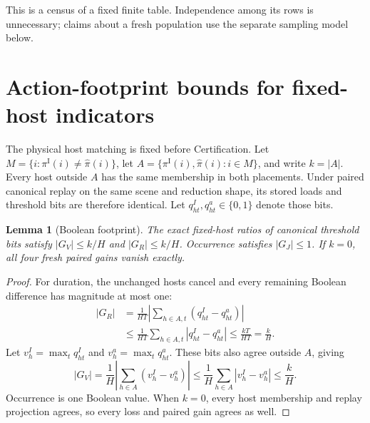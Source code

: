 \documentclass[11pt]{article}
\newtheorem{lemma}{Lemma}
\newcommand{\inc}{\pi^{\mathrm I}}
\newcommand{\act}{\widehat\pi}
\begin{document}
This is a census of a fixed finite table. Independence among its rows is unnecessary; claims about a fresh population use the separate sampling model below.

\section{Action-footprint bounds for fixed-host indicators}
The physical host matching is fixed before Certification. Let $M=\{i:\inc(i)\ne\act(i)\}$, let $A=\{\inc(i),\act(i):i\in M\}$, and write $k=|A|$. Every host outside $A$ has the same membership in both placements. Under paired canonical replay on the same scene and reduction shape, its stored loads and threshold bits are therefore identical. Let $q_{ht}^I,q_{ht}^a\in\{0,1\}$ denote those bits.

\begin{lemma}[Boolean footprint]
The exact fixed-host ratios of canonical threshold bits satisfy $|G_V|\le k/H$ and $|G_R|\le k/H$. Occurrence satisfies $|G_J|\le1$. If $k=0$, all four fresh paired gains vanish exactly.
\end{lemma}
\begin{proof}
For duration, the unchanged hosts cancel and every remaining Boolean difference has magnitude at most one:
\begin{align}
 |G_R|&=\frac1{HT}\left|\sum_{h\in A,t}(q_{ht}^I-q_{ht}^a)\right|\\
 &\le\frac1{HT}\sum_{h\in A,t}|q_{ht}^I-q_{ht}^a|\le\frac{kT}{HT}=\frac{k}{H}.
\end{align}
Let $v_h^I=\max_tq_{ht}^I$ and $v_h^a=\max_tq_{ht}^a$. These bits also agree outside $A$, giving
\begin{equation}
 |G_V|=\frac1H\left|\sum_{h\in A}(v_h^I-v_h^a)\right|\le\frac1H\sum_{h\in A}|v_h^I-v_h^a|\le\frac{k}{H}.
\end{equation}
Occurrence is one Boolean value. When $k=0$, every host membership and replay projection agrees, so every loss and paired gain agrees as well.
\end{proof}
\end{document}
